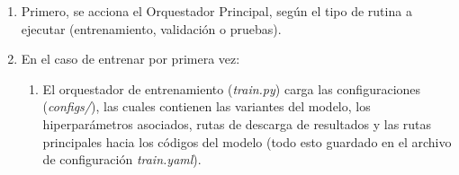 \begin{enumerate}
    \item Primero, se acciona el Orquestador Principal, según el tipo de rutina a ejecutar (entrenamiento, validación o pruebas).

    \item En el caso de entrenar por primera vez:

    \begin{enumerate}
        \item El orquestador de entrenamiento (\textit{train.py}) carga las configuraciones (\textit{configs/}), las cuales contienen las variantes del modelo, los hiperparámetros asociados, rutas de descarga de resultados y las rutas principales hacia los códigos del modelo (todo esto guardado en el archivo de configuración \textit{train.yaml}).


\end{enumerate}
\end{enumerate}

